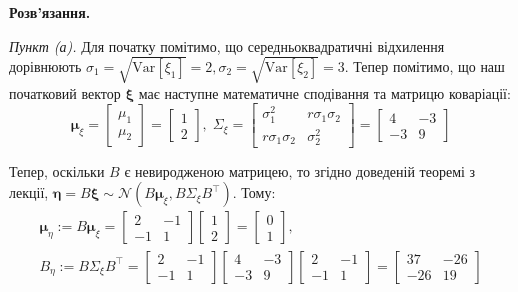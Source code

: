 \documentclass{hw_template}
\begin{document}
\textbf{Розв'язання.} 

\textit{Пункт (а).} Для початку помітимо, що середньоквадратичні відхилення дорівнюють $\sigma_1 = \sqrt{\text{Var}[\xi_1]}=2, \sigma_2 = \sqrt{\text{Var}[\xi_2]} = 3$. Тепер помітимо, що наш початковий вектор $\boldsymbol{\xi}$ має наступне математичне сподівання та матрицю коваріації:
\begin{equation*}
    \boldsymbol{\mu}_{\xi} = \begin{bmatrix}
    \mu_1 \\ \mu_2
    \end{bmatrix} = \begin{bmatrix}
        1 \\ 2
    \end{bmatrix}, \; \Sigma_{\xi} = \begin{bmatrix}
        \sigma_1^2 & r\sigma_1\sigma_2 \\
        r\sigma_1\sigma_2 & \sigma_2^2
    \end{bmatrix} = \begin{bmatrix}
        4 & -3 \\ -3 & 9
    \end{bmatrix}
\end{equation*}

Тепер, оскільки $B$ є невиродженою матрицею, то згідно доведеній теоремі з лекції, $\boldsymbol{\eta} = B\boldsymbol{\xi} \sim \mathcal{N}(B\boldsymbol{\mu}_{\xi}, B\Sigma_{\xi}B^{\top})$. Тому:
\begin{align*}
    \boldsymbol{\mu}_{\eta} := B\boldsymbol{\mu}_{\xi} = \begin{bmatrix}
        2 & -1 \\ -1 & 1
    \end{bmatrix} \begin{bmatrix}
        1 \\ 2
    \end{bmatrix} = \begin{bmatrix}
        0 \\ 1
    \end{bmatrix}, \\ B_{\eta} := B\Sigma_{\xi}B^{\top} = \begin{bmatrix}
        2 & -1 \\ -1 & 1
    \end{bmatrix} \begin{bmatrix}
        4 & -3 \\ -3 & 9
    \end{bmatrix} \begin{bmatrix}
        2 & -1 \\ -1 & 1
    \end{bmatrix} = \begin{bmatrix}
        37 & -26 \\ -26 & 19
    \end{bmatrix}
\end{align*}
\end{document}
